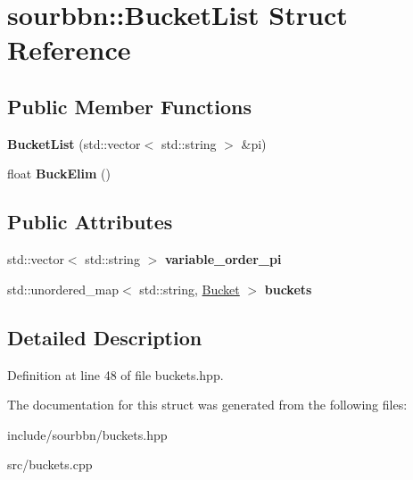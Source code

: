 \hypertarget{structsourbbn_1_1BucketList}{}\section{sourbbn\+:\+:Bucket\+List Struct Reference}
\label{structsourbbn_1_1BucketList}
\subsection*{Public Member Functions}
\begin{DoxyCompactItemize}
\item 
\mbox{\label{structsourbbn_1_1BucketList_aff121e1039b574c61b94e299653fee03}} 
{\bfseries Bucket\+List} (std\+::vector$<$ std\+::string $>$ \&pi)
\item 
\mbox{\label{structsourbbn_1_1BucketList_ae67265af182b411ef3d9c63d14534a80}} 
float {\bfseries Buck\+Elim} ()
\end{DoxyCompactItemize}
\subsection*{Public Attributes}
\begin{DoxyCompactItemize}
\item 
\mbox{\label{structsourbbn_1_1BucketList_ae7f9bad12a59676dfc1693b1f30d3f26}} 
std\+::vector$<$ std\+::string $>$ {\bfseries variable\+\_\+order\+\_\+pi}
\item 
\mbox{\label{structsourbbn_1_1BucketList_af141e28b4e77be7f659e257af006c1f3}} 
std\+::unordered\+\_\+map$<$ std\+::string, \hyperlink{structsourbbn_1_1Bucket}{Bucket} $>$ {\bfseries buckets}
\end{DoxyCompactItemize}


\subsection{Detailed Description}


Definition at line 48 of file buckets.\+hpp.



The documentation for this struct was generated from the following files\+:\begin{DoxyCompactItemize}
\item 
include/sourbbn/buckets.\+hpp\item 
src/buckets.\+cpp\end{DoxyCompactItemize}
